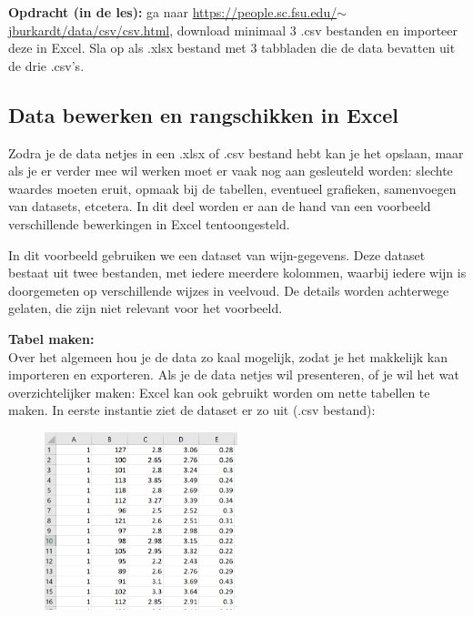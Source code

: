 \textbf{Opdracht (in de les):} ga naar \href{https://people.sc.fsu.edu/~jburkardt/data/csv/csv.html}{\textsf{https://people.sc.fsu.edu/$\sim$jburkardt/data/csv/csv.html}}, download minimaal 3 .csv bestanden en importeer deze in Excel. Sla op als .xlsx bestand met 3 tabbladen die de data bevatten uit de drie .csv's.

\subsection{Data bewerken en rangschikken in Excel}
Zodra je de data netjes in een .xlsx of .csv bestand hebt kan je het opslaan, maar als je er verder mee wil werken moet er vaak nog aan gesleuteld worden: slechte waardes moeten eruit, opmaak bij de tabellen, eventueel grafieken, samenvoegen van datasets, etcetera. In dit deel worden er aan de hand van een voorbeeld verschillende bewerkingen in Excel tentoongesteld.

In dit voorbeeld gebruiken we een dataset van wijn-gegevens. Deze dataset bestaat uit twee bestanden, met iedere meerdere kolommen, waarbij iedere wijn is doorgemeten op verschillende wijzes in veelvoud. De details worden achterwege gelaten, die zijn niet relevant voor het voorbeeld. 

\textbf{Tabel maken:}\\
Over het algemeen hou je de data zo kaal mogelijk, zodat je het makkelijk kan importeren en exporteren. Als je de data netjes wil presenteren, of je wil het wat overzichtelijker maken: Excel kan ook gebruikt worden om nette tabellen te maken.
In eerste instantie ziet de dataset er zo uit (.csv bestand):

\begin{figure}[h]
\begin{center}
\includegraphics[width=0.5\textwidth]{img/wijn1.png}
\end{center}
\end{figure}

